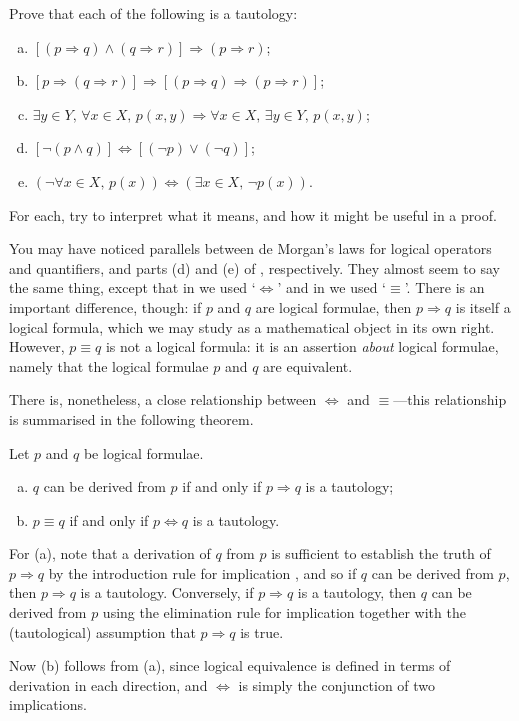 \begin{exercise}
\label{exTautologies}
Prove that each of the following is a tautology:
\begin{enumerate}[(a)]
\item $[(p \Rightarrow q) \wedge (q \Rightarrow r)] \Rightarrow (p \Rightarrow r)$;
\item $[p \Rightarrow (q \Rightarrow r)] \Rightarrow [(p \Rightarrow q) \Rightarrow (p \Rightarrow r)]$;
\item $\exists y \in Y,\, \forall x \in X,\, p(x,y) \Rightarrow \forall x \in X,\, \exists y \in Y,\, p(x,y)$;
\item $[\neg (p \wedge q)] \Leftrightarrow [(\neg p) \vee (\neg q)]$;
\item $(\neg \forall x \in X,\, p(x)) \Leftrightarrow (\exists x \in X,\, \neg p(x))$.
\end{enumerate}
For each, try to interpret what it means, and how it might be useful in a proof.
\end{exercise}

You may have noticed parallels between de Morgan's laws for logical operators and quantifiers, and parts (d) and (e) of , respectively. They almost seem to say the same thing, except that in  we used `$\Leftrightarrow$' and in  we used `$\equiv$'. There is an important difference, though: if $p$ and $q$ are logical formulae, then $p \Rightarrow q$ is itself a logical formula, which we may study as a mathematical object in its own right. However, $p \equiv q$ is not a logical formula: it is an assertion \textit{about} logical formulae, namely that the logical formulae $p$ and $q$ are equivalent.

There is, nonetheless, a close relationship between $\Leftrightarrow$ and $\equiv$---this relationship is summarised in the following theorem.

\begin{theorem}
\label{thmTautologyAndDerivation}
Let $p$ and $q$ be logical formulae.
\begin{enumerate}[(a)]
\item $q$ can be derived from $p$ if and only if $p \Rightarrow q$ is a tautology;
\item $p \equiv q$ if and only if $p \Leftrightarrow q$ is a tautology.
\end{enumerate}
\end{theorem}

\begin{cproof}
For (a), note that a derivation of $q$ from $p$ is sufficient to establish the truth of $p \Rightarrow q$ by the introduction rule for implication \introrule{\Rightarrow}, and so if $q$ can be derived from $p$, then $p \Rightarrow q$ is a tautology. Conversely, if $p \Rightarrow q$ is a tautology, then $q$ can be derived from $p$ using the elimination rule for implication \elimrule{\Rightarrow} together with the (tautological) assumption that $p \Rightarrow q$ is true.

Now (b) follows from (a), since logical equivalence is defined in terms of derivation in each direction, and $\Leftrightarrow$ is simply the conjunction of two implications.
\end{cproof}